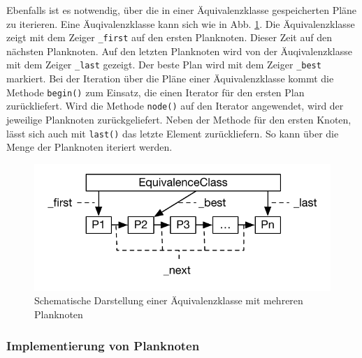 Ebenfalls ist es notwendig, über die in einer Äquivalenzklasse gespeicherten Pläne zu iterieren. Eine Äuqivalenzklasse kann sich wie in Abb. \ref{EquivalenceClassList}. Die Äquivalenzklasse zeigt mit dem Zeiger \texttt{\_first} auf den ersten Planknoten. Dieser Zeit auf den nächsten Planknoten. Auf den letzten Planknoten wird von der Äuqivalenzklasse mit dem Zeiger \texttt{\_last} gezeigt. Der beste Plan wird mit dem Zeiger \texttt{\_best} markiert. Bei der Iteration über die Pläne einer Äquivalenzklasse kommt die Methode \texttt{begin()} zum Einsatz, die einen Iterator für den ersten Plan zurückliefert. Wird die Methode \texttt{node()} auf den Iterator angewendet, wird der jeweilige Planknoten zurückgeliefert. Neben der Methode für den ersten Knoten, lässt sich auch mit \texttt{last()} das letzte Element zurückliefern. So kann über die Menge der Planknoten iteriert werden.

\begin{figure}[ht]
  \centering
  \includegraphics{04_Implementierung/00_media/EquivalenceClassList.pdf}
  \caption{Schematische Darstellung einer Äquivalenzklasse mit mehreren Planknoten}
  \label{EquivalenceClassList}
\end{figure}


\subsubsection{Implementierung von Planknoten}


